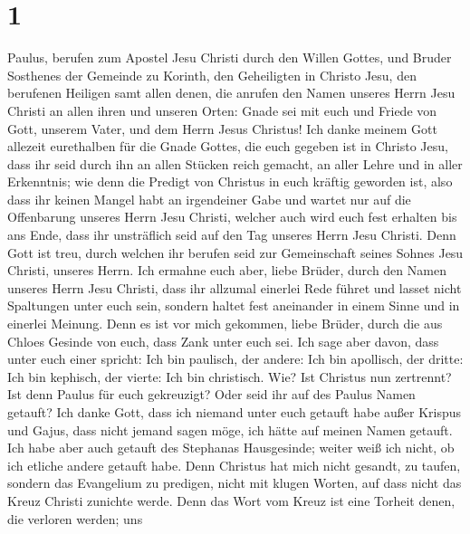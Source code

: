 \hypertarget{section}{%
\section{1}\label{section}}

 Paulus, berufen zum Apostel Jesu Christi durch den Willen
Gottes, und Bruder Sosthenes  der Gemeinde zu Korinth, den
Geheiligten in Christo Jesu, den berufenen Heiligen samt allen denen,
die anrufen den Namen unseres Herrn Jesu Christi an allen ihren und
unseren Orten:  Gnade sei mit euch und Friede von Gott,
unserem Vater, und dem Herrn Jesus Christus!  Ich danke
meinem Gott allezeit eurethalben für die Gnade Gottes, die euch gegeben
ist in Christo Jesu,  dass ihr seid durch ihn an allen
Stücken reich gemacht, an aller Lehre und in aller Erkenntnis;
 wie denn die Predigt von Christus in euch kräftig
geworden ist,  also dass ihr keinen Mangel habt an
irgendeiner Gabe und wartet nur auf die Offenbarung unseres Herrn Jesu
Christi,  welcher auch wird euch fest erhalten bis ans
Ende, dass ihr unsträflich seid auf den Tag unseres Herrn Jesu Christi.
 Denn Gott ist treu, durch welchen ihr berufen seid zur
Gemeinschaft seines Sohnes Jesu Christi, unseres Herrn. 
Ich ermahne euch aber, liebe Brüder, durch den Namen unseres Herrn Jesu
Christi, dass ihr allzumal einerlei Rede führet und lasset nicht
Spaltungen unter euch sein, sondern haltet fest aneinander in einem
Sinne und in einerlei Meinung.  Denn es ist vor mich
gekommen, liebe Brüder, durch die aus Chloes Gesinde von euch, dass Zank
unter euch sei.  Ich sage aber davon, dass unter euch
einer spricht: Ich bin paulisch, der andere: Ich bin apollisch, der
dritte: Ich bin kephisch, der vierte: Ich bin christisch.
 Wie? Ist Christus nun zertrennt? Ist denn Paulus für
euch gekreuzigt? Oder seid ihr auf des Paulus Namen getauft?
 Ich danke Gott, dass ich niemand unter euch getauft habe
außer Krispus und Gajus,  dass nicht jemand sagen möge,
ich hätte auf meinen Namen getauft.  Ich habe aber auch
getauft des Stephanas Hausgesinde; weiter weiß ich nicht, ob ich etliche
andere getauft habe.  Denn Christus hat mich nicht
gesandt, zu taufen, sondern das Evangelium zu predigen, nicht mit klugen
Worten, auf dass nicht das Kreuz Christi zunichte werde. 
Denn das Wort vom Kreuz ist eine Torheit denen, die verloren werden; uns
